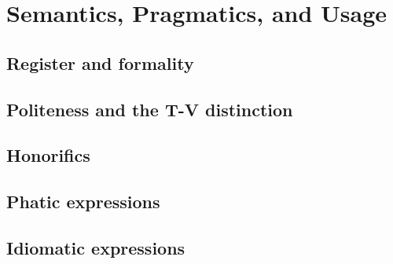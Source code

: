 \chapter{Semantics, Pragmatics, and Usage}\label{ch:semantics}


\section{Register and formality}\label{sec:register}


\section{Politeness and the T-V distinction}\label{sec:politeness}


\section{Honorifics}\label{sec:honorifics}


\section{Phatic expressions}\label{sec:phatic}


\section{Idiomatic expressions}\label{sec:idioms}


